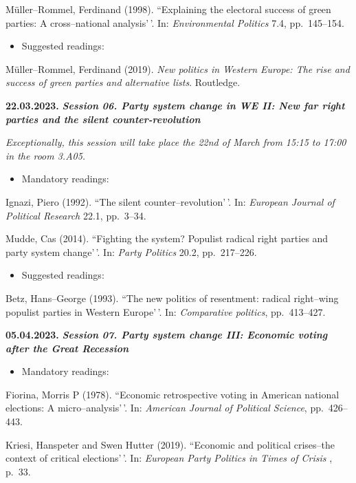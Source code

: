 \documentclass[
  12pt,
]{article}
\providecommand{\tightlist}{%
  \setlength{\itemsep}{0pt}\setlength{\parskip}{0pt}}
\begin{document}
Müller--Rommel, Ferdinand (1998). ``Explaining the electoral success of
green parties: A cross--national analysis'\,'. In:
\emph{Environmental Politics} 7.4, pp.~145--154.

\begin{itemize}
\tightlist
\item
  Suggested readings:
\end{itemize}

Müller--Rommel, Ferdinand (2019).
\emph{New politics in Western Europe: The rise and success of green parties and alternative lists}.
Routledge.

\textbf{22.03.2023.} \textbf{\emph{Session 06. Party system change in WE
II: New far right parties and the silent counter-revolution}}

\emph{Exceptionally, this session will take place the 22nd of March from
15:15 to 17:00 in the room 3.A05.}

\begin{itemize}
\tightlist
\item
  Mandatory readings:
\end{itemize}

Ignazi, Piero (1992). ``The silent counter--revolution'\,'. In:
\emph{European Journal of Political Research} 22.1, pp.~3--34.

Mudde, Cas (2014). ``Fighting the system? Populist radical right parties
and party system change'\,'. In: \emph{Party Politics} 20.2,
pp.~217--226.

\begin{itemize}
\tightlist
\item
  Suggested readings:
\end{itemize}

Betz, Hans--George (1993). ``The new politics of resentment: radical
right--wing populist parties in Western Europe'\,'. In:
\emph{Comparative politics}, pp.~413--427.

\textbf{05.04.2023.} \textbf{\emph{Session 07. Party system change III:
Economic voting after the Great Recession}}

\begin{itemize}
\tightlist
\item
  Mandatory readings:
\end{itemize}

Fiorina, Morris P (1978). ``Economic retrospective voting in American
national elections: A micro--analysis'\,'. In:
\emph{American Journal of Political Science}, pp.~426--443.

Kriesi, Hanspeter and Swen Hutter (2019). ``Economic and political
crises--the context of critical elections'\,'. In:
\emph{European Party Politics in Times of Crisis} , p.~33.
\end{document}
